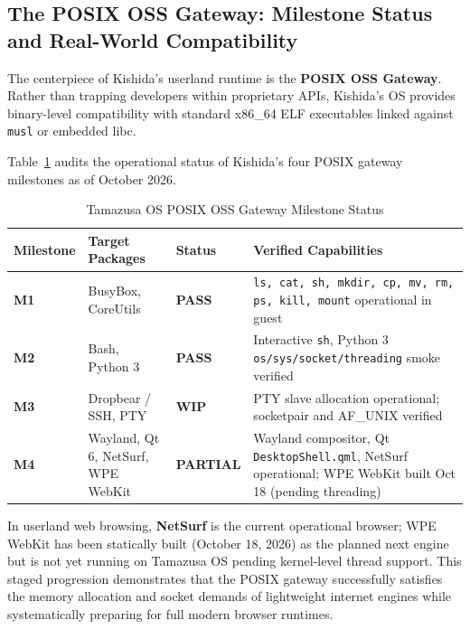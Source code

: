 \documentclass[10pt,journal,compsoc,twocolumn]{article}
\begin{document}
\subsection{The POSIX OSS Gateway: Milestone Status and Real-World Compatibility}
The centerpiece of Kishida's userland runtime is the \textbf{POSIX OSS Gateway}. Rather than trapping developers within proprietary APIs, Kishida's OS provides binary-level compatibility with standard x86\_64 ELF executables linked against \texttt{musl} or embedded libc.

Table~\ref{tab:posix_audit} audits the operational status of Kishida's four POSIX gateway milestones as of October 2026.

\begin{table}[htbp]
\centering
\caption{Tamazusa OS POSIX OSS Gateway Milestone Status}
\label{tab:posix_audit}
\scriptsize
\setlength{\tabcolsep}{4pt}
\renewcommand{\arraystretch}{1.15}
\begin{tabularx}{\columnwidth}{@{} l >{\raggedright\arraybackslash}p{2.8cm} l X @{}}
\toprule
Milestone & Target Packages & Status & Verified Capabilities \\
\midrule
\textbf{M1} & BusyBox, CoreUtils & \textbf{PASS} & \texttt{ls, cat, sh, mkdir, cp, mv, rm, ps, kill, mount} operational in guest \\
\textbf{M2} & Bash, Python 3 & \textbf{PASS} & Interactive \texttt{sh}, Python 3 \texttt{os/sys/socket/threading} smoke verified \\
\textbf{M3} & Dropbear / SSH, PTY & \textbf{WIP} & PTY slave allocation operational; socketpair and AF\_UNIX verified \\
\textbf{M4} & Wayland, Qt 6, NetSurf, WPE WebKit & \textbf{PARTIAL} & Wayland compositor, Qt \texttt{DesktopShell.qml}, NetSurf operational; WPE WebKit built Oct 18 (pending threading) \\
\bottomrule
\end{tabularx}
\end{table}

In userland web browsing, \textbf{NetSurf} is the current operational browser; WPE WebKit has been statically built (October 18, 2026) as the planned next engine but is not yet running on Tamazusa OS pending kernel-level thread support. This staged progression demonstrates that the POSIX gateway successfully satisfies the memory allocation and socket demands of lightweight internet engines while systematically preparing for full modern browser runtimes.
\end{document}
